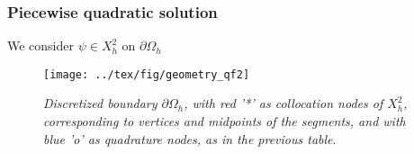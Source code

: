 \documentclass[handout]{beamer}
\begin{document}
\begin{frame}
 \frametitle{Piecewise quadratic solution}
 We consider $\psi\in X^2_h$ on $\partial\Omega_h$
\begin{center}
\begin{figure}
\centering
{
\texttt{[image: ../tex/fig/geometry\_qf2]}
}
\caption{\emph{Discretized boundary $\partial\Omega_h$, with red '*' as collocation nodes of $X^2_h$, 
corresponding to vertices and midpoints of the segments, and with blue 'o' as quadrature nodes, as in the 
previous table}.}
\label{fig:qf2}
\end{figure}
\end{center}
\end{frame}
\end{document}
